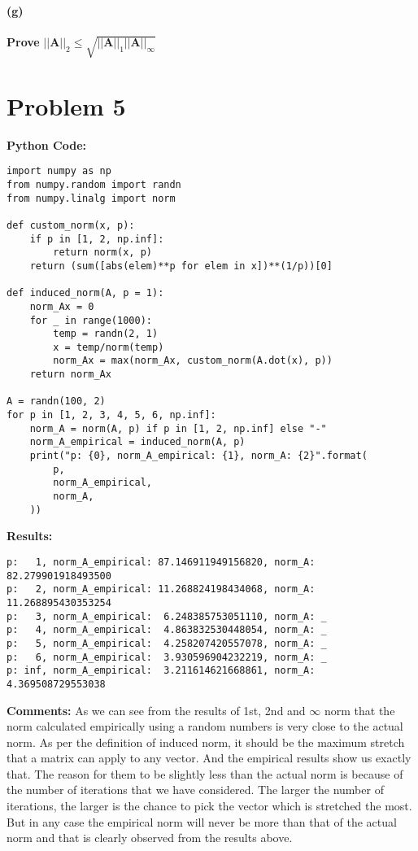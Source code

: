 \documentclass[12pt, letterpaper]{article}
\begin{document}
\paragraph{(g)} \textbf{Prove} $||\mathbf{A}||_2 \leq \sqrt{||\mathbf{A}||_1||\mathbf{A}||_\infty}$


\pagebreak
\section*{Problem 5}
\label{sec:problem-5}

\textbf{Python Code:}
\begin{verbatim}
import numpy as np
from numpy.random import randn
from numpy.linalg import norm

def custom_norm(x, p):
    if p in [1, 2, np.inf]:
        return norm(x, p)
    return (sum([abs(elem)**p for elem in x])**(1/p))[0]

def induced_norm(A, p = 1):
    norm_Ax = 0
    for _ in range(1000):
        temp = randn(2, 1)
        x = temp/norm(temp)
        norm_Ax = max(norm_Ax, custom_norm(A.dot(x), p))
    return norm_Ax

A = randn(100, 2)
for p in [1, 2, 3, 4, 5, 6, np.inf]:
    norm_A = norm(A, p) if p in [1, 2, np.inf] else "-"
    norm_A_empirical = induced_norm(A, p)
    print("p: {0}, norm_A_empirical: {1}, norm_A: {2}".format(
        p,
        norm_A_empirical,
        norm_A,
    ))
\end{verbatim}
\vspace{2em}

\textbf{Results:}
\begin{verbatim}
p:   1, norm_A_empirical: 87.146911949156820, norm_A: 82.279901918493500
p:   2, norm_A_empirical: 11.268824198434068, norm_A: 11.268895430353254
p:   3, norm_A_empirical:  6.248385753051110, norm_A: _
p:   4, norm_A_empirical:  4.863832530448054, norm_A: _
p:   5, norm_A_empirical:  4.258207420557078, norm_A: _
p:   6, norm_A_empirical:  3.930596904232219, norm_A: _
p: inf, norm_A_empirical:  3.211614621668861, norm_A:  4.369508729553038
\end{verbatim}
\vspace{2em}

\textbf{Comments:}
As we can see from the results of 1st, 2nd and $\infty$ norm that the norm calculated empirically using a random numbers is very close to the actual norm. As per the definition of induced norm, it should be the maximum stretch that a matrix can apply to any vector. And the empirical results show us exactly that. The reason for them to be slightly less than the actual norm is because of the number of iterations that we have considered. The larger the number of iterations, the larger is the chance to pick the vector which is stretched the most. But in any case the empirical norm will never be more than that of the actual norm and that is clearly observed from the results above.
\end{document}
